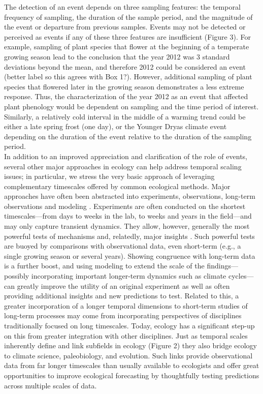 \documentclass[11pt,a4paper,oneside]{article}
\begin{document}
The detection of an event depends on three sampling features: the temporal frequency of sampling, the duration of the sample period, and the magnitude of the event or departure from previous samples. Events may not be detected or perceived as events if any of these three features are insufficient (Figure 3). For example, sampling of plant species that flower at the beginning of a temperate growing season lead to the conclusion that the year 2012 was 3 standard deviations beyond the mean, and therefore 2012 could be considered an event (better label so this agrees with Box 1?). However, additional sampling of plant species that flowered later in the growing season demonstrates a less extreme response. Thus, the characterization of the year 2012 as an event that affected plant phenology would be dependent on sampling and the time period of interest. Similarly, a relatively cold interval in the middle of a warming trend could be either a late spring frost (one day), or the Younger Dryas climate event \citep{Jackson:2009el} depending on the duration of the event relative to the duration of the sampling period. \\

In addition to an improved appreciation and clarification of the role of events, several other major approaches in ecology can help address temporal scaling issues; in particular, we stress the very basic approach of leveraging complementary timescales offered by common ecological methods. Major approaches have often been abstracted into experiments, observations, long-term observations and modeling \citep{Carpenter:1992hk}. Experiments are often conducted on the shortest timescales---from days to weeks in the lab, to weeks and years in the field---and may only capture transient dynamics. They allow, however, generally the most powerful tests of mechanisms and, relatedly, major insights \citep{Chapin:1995af,Wolkovich:2012n,Laube2014}. Such powerful tests are buoyed by comparisons with observational data, even short-term (e.g., a single growing season or several years). Showing congruence with long-term data is a further boost, and using modeling to extend the scale of the findings---possibly incorporating important longer-term dynamics such as climate cycles---can greatly improve the utility of an original experiment as well as often providing additional insights and new predictions to test. Related to this, a greater incorporation of a longer temporal dimensions to short-term studies of long-term processes may come from incorporating perspectives of disciplines traditionally focused on long timescales. Today, ecology has a significant step-up on this from greater integration with other disciplines. Just as temporal scales inherently define and link subfields in ecology (Figure 2) they also bridge ecology to climate science, paleobiology, and evolution. Such links provide observational data from far longer timescales than usually available to ecologists and offer great opportunities to improve ecological forecasting by thoughtfully testing predictions across multiple scales of data. \\
\end{document}
